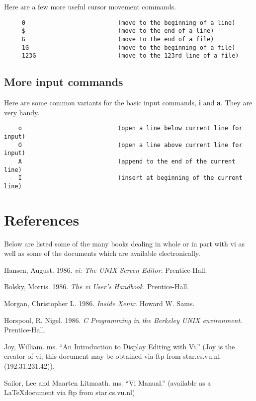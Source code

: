 Here are a few more useful cursor movement commands.

\begin{verbatim}
     0                          (move to the beginning of a line)
     $                          (move to the end of a line)
     G                          (move to the end of a file)
     1G                         (move to the beginning of a file)
     123G                       (move to the 123rd line of a file)
\end{verbatim}

\subsection{More input commands}

Here are some common variants for the basic input commands, {\bf i} and
{\bf a}. They are very handy.

\begin{verbatim}
    o                           (open a line below current line for input)
    O                           (open a line above current line for input)
    A                           (append to the end of the current line)
    I                           (insert at beginning of the current line)
\end{verbatim}

\section{References}

Below are listed some of the many books 
dealing in whole or in part with vi as well as some of 
the documents which are available electronically.


Hansen, August. 1986. {\em vi: The UNIX Screen Editor}. Prentice-Hall.

Bolsky, Morris. 1986. {\em The vi User's Handbook}. Prentice-Hall.

Morgan, Christopher L. 1986. {\em Inside Xenix}. Howard W. Sams.

Horspool, R. Nigel. 1986. {\em C Programming in the Berkeley UNIX
environment}. Prentice-Hall.

Joy, William. ms. ``An Introduction to Display Editing with Vi.'' 
(Joy is the creator of vi; this document may be obtained via 
ftp from star.cs.vu.nl (192.31.231.42)).

Sailor, Lee and Maarten Litmaath. ms. ``Vi Manual.'' (available as 
a \LaTeX document via ftp from star.cs.vu.nl)



